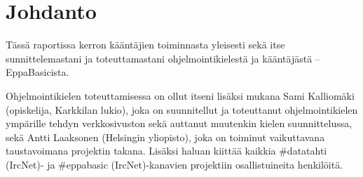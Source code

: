 
\section{Johdanto}
\begin{comment}
Tietokoneet ymmärtävät konekieltä.
Konekieli muodostuu yksinkertaisisista komennoista,
joiden nopeaan suorittamiseen tietokoneet on suunniteltu.
Ihmiset ovat kuitenkin huonoja kirjoittamaan konekieltä
sen alkukantaisten komentojen vuoksi.
Ihmisiä varten onkin kehitelty erilaisia ohjelmointikieliä,
jotka sisältävät erilaisia abstraktioita ohjelmoinnin helpottamiseksi.

Muunnos ohjelmointikielestä konekieleen ei kuitenkaan aina ole yksinkertainen.
Monet ohjelmointikielten abstraktiot voidaan toteuttaa hyvinkin eri tavoin konekielessä,
sillä eri tietokonearkkitehtuurit sisältävät hyvinkin erilaisia konekielisiä komentoja.
Lisäksi lyhyistäkin ohjelmakoodinpätkistä voi syntyä pitkiä konekielisiä ohjelmia,
joten pientenkin ohjelmien muuttaminen konekieleksi voi viedä ohjelmoijalta tunteja.

Tämän prosessin automatisoimiseksi on kehitetty ohjelmia, joita kutsutaan kääntäjiksi.
Kääntäjä on yksinkertaisesti ohjelma, joka muuttaa koodia muodosta toiseen.
Usein tämä tarkoittaa ohjelmointikielen muuttamista konekieleksi,
mutta on myös olemassa kääntäjiä,
jotka kääntävät ohjelmointikieliä toisikseen.
Tällaisia kääntäjiä kutsutaan source-to-source-kääntäjiksi.
\end{comment}

Tässä raportissa kerron kääntäjien toiminnasta yleisesti
sekä itse sunnittelemastani ja toteuttamastani ohjelmointikielestä ja kääntäjästä -- EppaBasicista.

Ohjelmointikielen toteuttamisessa on ollut itseni lisäksi mukana
Sami Kalliomäki (opiskelija, Karkkilan lukio),
joka on suunnitellut ja toteuttanut ohjelmointikielen ympärille tehdyn verkkosivuston
sekä auttanut muutenkin kielen suunnittelussa,
sekä Antti Laaksonen (Helsingin yliopisto),
joka on toiminut vaikuttavana taustavoimana projektin takana.
Lisäksi haluan kiittää kaikkia \#datatahti (IrcNet)- ja \#eppabasic (IrcNet)-kanavien projektiin osallistuineita henkilöitä.


%
